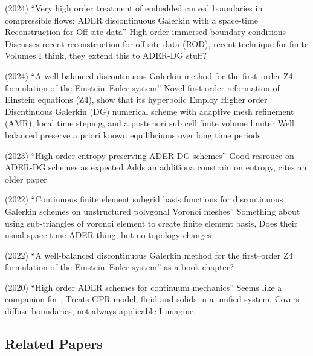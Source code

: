 \begin{outline}
  \1 (2024) ``Very high order treatment of embedded curved boundaries in compressible flows: ADER discontinuous Galerkin with a space-time Reconstruction for Off-site data'' \cite{ciallella2024very}
  \2 High order immersed boundary conditions
  \2 Discusses recent reconstruction for off-site data (ROD), recent technique for finite Volumes
  \2 I think, they extend this to ADER-DG stuff?

  \1 (2024) ``A well-balanced discontinuous Galerkin method for the first--order Z4 formulation of the Einstein--Euler system'' \cite{dumbser2024well}
  \2 Novel first order reformation of Einstein equations (Z4), show that its hyperbolic
  \2 Employ Higher order Discntinuous Galerkin (DG) numerical scheme with adaptive mesh refinement (AMR), local time steping, and a posteriori sub cell finite volume limiter
  \2 Well balanced preserve a priori known equilibriums over long time periods

  \1 (2023) ``High order entropy preserving ADER-DG schemes'' \cite{gaburro2023high}
  \2 Good resrouce on ADER-DG schemes as expected
  \2 Adds an additiona constrain on entropy, cites an older paper \cite{harten1983symmetric} 

  \1 (2022) ``Continuous finite element subgrid basis functions for discontinuous Galerkin schemes on unstructured polygonal Voronoi meshes'' \cite{boscheri2022continuous}
  \2 Something about using sub-triangles of voronoi element to create finite element basis,
  \2 Does their usual space-time ADER thing, but no topology changes

  \1 (2022) ``A well-balanced discontinuous Galerkin method for the first--order Z4 formulation of the Einstein--Euler system'' \cite{Gaburro2021High}
  \2 \cite{Gaburro2020High} as a book chapter?

  \1 (2020) ``High order ADER schemes for continuum mechanics'' \cite{busto2020high}
  \2 Seems like a companion for \cite{Gaburro2020High},
  \2 Treats GPR model, fluid and solids in a unified system.
  \2 Covers diffuse boundaries, not always applicable I imagine.
\end{outline}

\subsection{Related Papers}

